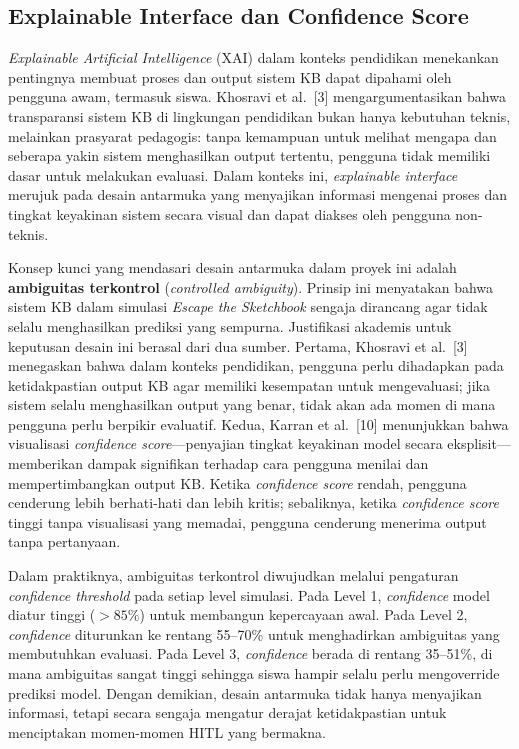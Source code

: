 \documentclass[12pt,oneside]{report}
\begin{document}
\subsection{Explainable Interface dan Confidence Score}
\label{subsec:explainable-interface}

\textit{Explainable Artificial Intelligence} (XAI) dalam konteks pendidikan menekankan pentingnya membuat proses dan output sistem KB dapat dipahami oleh pengguna awam, termasuk siswa. Khosravi et al.\ [3] mengargumentasikan bahwa transparansi sistem KB di lingkungan pendidikan bukan hanya kebutuhan teknis, melainkan prasyarat pedagogis: tanpa kemampuan untuk melihat mengapa dan seberapa yakin sistem menghasilkan output tertentu, pengguna tidak memiliki dasar untuk melakukan evaluasi. Dalam konteks ini, \textit{explainable interface} merujuk pada desain antarmuka yang menyajikan informasi mengenai proses dan tingkat keyakinan sistem secara visual dan dapat diakses oleh pengguna non-teknis.

Konsep kunci yang mendasari desain antarmuka dalam proyek ini adalah \textbf{ambiguitas terkontrol} (\textit{controlled ambiguity}). Prinsip ini menyatakan bahwa sistem KB dalam simulasi \textit{Escape the Sketchbook} sengaja dirancang agar tidak selalu menghasilkan prediksi yang sempurna. Justifikasi akademis untuk keputusan desain ini berasal dari dua sumber. Pertama, Khosravi et al.\ [3] menegaskan bahwa dalam konteks pendidikan, pengguna perlu dihadapkan pada ketidakpastian output KB agar memiliki kesempatan untuk mengevaluasi; jika sistem selalu menghasilkan output yang benar, tidak akan ada momen di mana pengguna perlu berpikir evaluatif. Kedua, Karran et al.\ [10] menunjukkan bahwa visualisasi \textit{confidence score}---penyajian tingkat keyakinan model secara eksplisit---memberikan dampak signifikan terhadap cara pengguna menilai dan mempertimbangkan output KB. Ketika \textit{confidence score} rendah, pengguna cenderung lebih berhati-hati dan lebih kritis; sebaliknya, ketika \textit{confidence score} tinggi tanpa visualisasi yang memadai, pengguna cenderung menerima output tanpa pertanyaan.

Dalam praktiknya, ambiguitas terkontrol diwujudkan melalui pengaturan \textit{confidence threshold} pada setiap level simulasi. Pada Level 1, \textit{confidence} model diatur tinggi ($>85\%$) untuk membangun kepercayaan awal. Pada Level 2, \textit{confidence} diturunkan ke rentang 55--70\% untuk menghadirkan ambiguitas yang membutuhkan evaluasi. Pada Level 3, \textit{confidence} berada di rentang 35--51\%, di mana ambiguitas sangat tinggi sehingga siswa hampir selalu perlu mengoverride prediksi model. Dengan demikian, desain antarmuka tidak hanya menyajikan informasi, tetapi secara sengaja mengatur derajat ketidakpastian untuk menciptakan momen-momen HITL yang bermakna.
\end{document}
